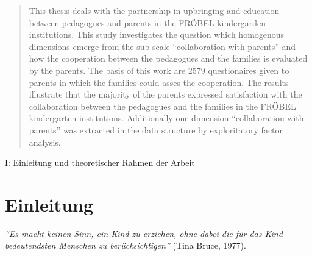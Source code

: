 \documentclass[12pt,a4paper]{article}
\begin{document}
\begin{abstract}
This thesis deals with the partnership in upbringing and education between
pedagogues and parents in the FRÖBEL kindergarden institutions. This study
investigates the question which homogenous dimensions emerge from the sub scale
``collaboration with parents'' and how the cooperation between the pedagogues
and the families is evaluated by the parents.
The basis of this work are 2579 questionaires given to parents in which the
families could asses the cooperation.
The results illustrate that the majority of the parents expressed satisfaction
with the collaboration between the pedagogues and the families in the FRÖBEL
kindergarten institutions. Additionally one dimension ``collaboration with
parents'' was extracted in the data structure by exploritatory factor analysis.
\end{abstract}

\pagebreak

\tableofcontents
\pagebreak
\listoffigures
\pagebreak
\listoftables
\pagebreak

\begin{titlepage}
\end{titlepage}
\vspace*{\fill}
\begin{Huge}\noindent
I: Einleitung und theoretischer Rahmen der Arbeit
\end{Huge}
\vspace*{\fill}
\pagebreak

\section{Einleitung}
\textit{"`Es macht keinen Sinn, ein Kind zu erziehen, ohne dabei die für das Kind bedeutendsten Menschen zu berücksichtigen"'}
 (Tina Bruce, 1977).\\
 
\end{document}
